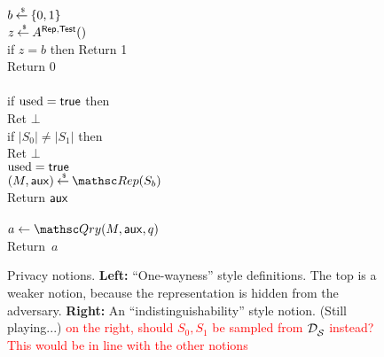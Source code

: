 \begin{figure}[htp]
\centering
{}
%
{
{
\\
$b {\:\stackrel{{\scriptscriptstyle \hspace{0.2em}\$}} {\leftarrow}\:} \{0,1\}$\\
$z {\:\stackrel{{\scriptscriptstyle \hspace{0.2em}\$}} {\leftarrow}\:} A^{\mathsf{Rep},\mathsf{Test}}()$\\
if $z = b$ then Return 1\\
Return 0\\
}
%
{
\\
if $\mathrm{used}=\mathsf{true}$ then \\
\nudge Ret $\bot$\\
if $|S_0|\neq|S_1|$ then \\
\nudge Ret $\bot$\\
$\mathrm{used}=\mathsf{true}$\\
$(M,\aux) \getsr \Rep(S_b)$\\
Return ${\sf aux}$\\

\medskip
{}\\
$a \gets \Qry(M,\aux,q)$\\
Return~$a$\\
}
}
\caption{Privacy notions. {\bf Left:} ``One-wayness'' style
  definitions. The top is a weaker notion, because the representation
  is hidden from the adversary. {\bf Right:} An
  ``indistinguishability'' style notion. (Still playing...) \textcolor{red}{on the right, should $S_0,S_1$ be sampled from $\mathcal{D}_{{\cal S}}^{}$ instead?  This would be in line with the other notions}} 
\label{fig:privacy}
\end{figure}


